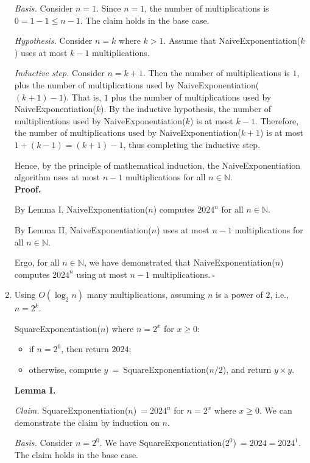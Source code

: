 \begin{enumerate}
\begin{solution}
\textit{Basis. }Consider $n=1$. Since $n=1$, the number of multiplications is $0=1-1\leq n-1$. The claim holds in the base case.

\textit{Hypothesis. }Consider $n=k$ where $k>1$. Assume that {\sc NaiveExponentiation}($k$) uses at most $k-1$ multiplications.

\textit{Inductive step. }Consider $n=k+1$. Then the number of multiplications is $1$, plus the number of multiplications used by {\sc NaiveExponentiation}($(k+1)-1$). That is, $1$ plus the number of multiplications used by {\sc NaiveExponentiation}($k$). By the inductive hypothesis, the number of multiplications used by {\sc NaiveExponentiation}($k$) is at most $k-1$. Therefore, the number of multiplications used by {\sc NaiveExponentiation}($k+1$) is at most $1+(k-1)=(k+1)-1$, thus completing the inductive step.

Hence, by the principle of mathematical induction, the {\sc NaiveExponentiation} algorithm uses at most $n-1$ multiplications for all $n\in\mathbb{N}$.\\

\textbf{Proof. }

By Lemma I, {\sc NaiveExponentiation}($n$) computes $2024^n$ for all $n\in\mathbb{N}$.

By Lemma II, {\sc NaiveExponentiation}($n$) uses at most $n-1$ multiplications for all $n\in\mathbb{N}$.

Ergo, for all $n\in\mathbb{N}$, we have demonstrated that {\sc NaiveExponentiation}($n$) computes $2024^n$ using at most $n-1$ multiplications.$~\square$
\end{solution}
\newpage
    \item Using $O(\log_2 n)$ many multiplications, assuming $n$ is a power of $2$, i.e., $n=2^k$.
\begin{solution}
{\sc SquareExponentiation}($n$) where $n=2^x$ for $x\geq 0$:
\begin{itemize}
\item if $n=2^0$, then return $2024$;
\item otherwise, compute $y~=~${\sc SquareExponentiation}($n/2$), and return $y\times y$.
\end{itemize}
\textbf{Lemma I. }

\textit{Claim. }{\sc SquareExponentiation}($n$)$~=2024^n$ for $n=2^x$ where $x\geq 0$. We can demonstrate the claim by induction on $n$.

\textit{Basis. }Consider $n=2^0$. We have {\sc SquareExponentiation}($2^0$)$~=2024=2024^1$. The claim holds in the base case.


\end{solution}
\end{enumerate}
